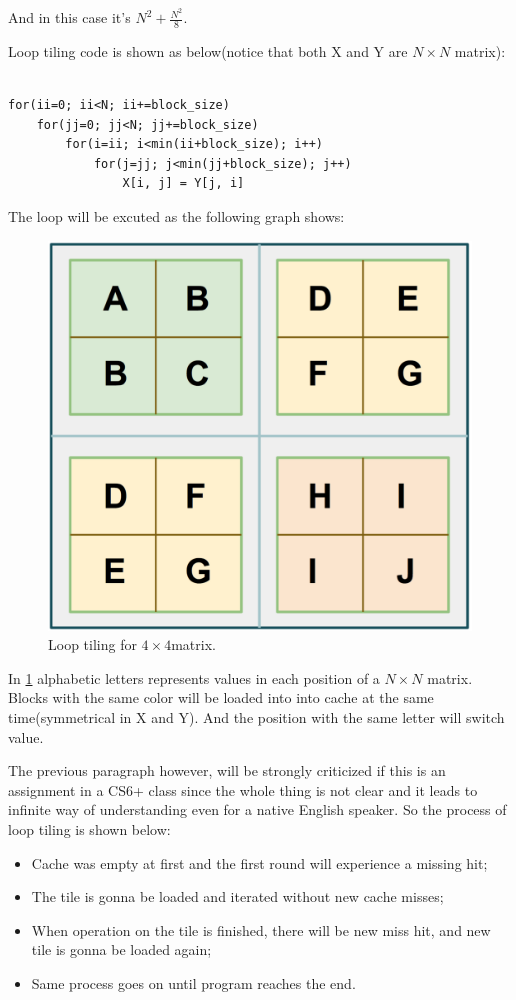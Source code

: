 \documentclass[12pt]{article}
\begin{document}
And in this case it's $N^2+\frac{N^2}{8}$. 

Loop tiling code is shown as below(notice that both X and Y are
$N\times N$ matrix):
\begin{verbatim}

for(ii=0; ii<N; ii+=block_size)
    for(jj=0; jj<N; jj+=block_size)
        for(i=ii; i<min(ii+block_size); i++)
            for(j=jj; j<min(jj+block_size); j++)
                X[i, j] = Y[j, i]
\end{verbatim}



The loop will be excuted as the following graph shows:

\begin{figure}[!ht]
  \centering
  \includegraphics[scale=0.3]{img/mat.png}
  \caption{Loop tiling for $4\times 4$matrix.}
  \label{fig:n}
\end{figure}

In \ref{fig:n} alphabetic letters represents values in each position
of a $N\times N$ matrix. Blocks with the same color will be loaded
into into cache at the same time(symmetrical in X and Y). And the
position with the same letter will switch value. 

The previous paragraph however, will be strongly criticized if this is
an assignment in a CS6+ class since the whole thing is not clear and
it leads to infinite way of understanding even for a native English
speaker. So the process of loop tiling is shown below:
\begin{itemize}[circle]
\item Cache was empty at first and the first round will experience a
  missing hit;
\item The tile is gonna be loaded and iterated without new cache
  misses;
\item When operation on the tile is finished, there will be new miss
  hit, and new tile is gonna be loaded again;
\item Same process goes on until program reaches the end.
\end{itemize}
\end{document}
